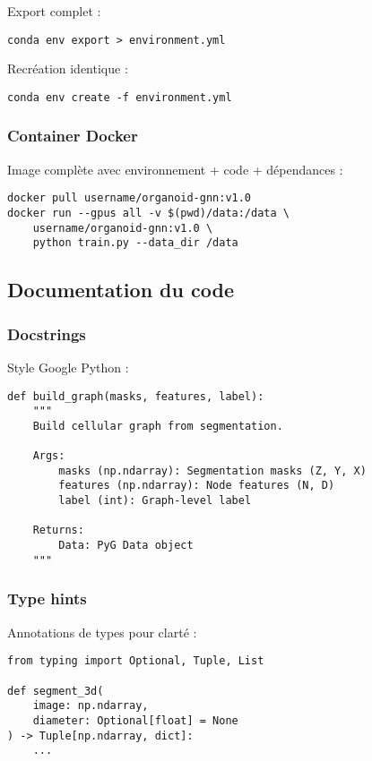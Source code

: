 Export complet :
\begin{verbatim}
conda env export > environment.yml
\end{verbatim}

Recréation identique :
\begin{verbatim}
conda env create -f environment.yml
\end{verbatim}

\subsubsection{Container Docker}

Image complète avec environnement + code + dépendances :
\begin{verbatim}
docker pull username/organoid-gnn:v1.0
docker run --gpus all -v $(pwd)/data:/data \
    username/organoid-gnn:v1.0 \
    python train.py --data_dir /data
\end{verbatim}

\subsection{Documentation du code}

\subsubsection{Docstrings}

Style Google Python :
\begin{verbatim}
def build_graph(masks, features, label):
    """
    Build cellular graph from segmentation.
    
    Args:
        masks (np.ndarray): Segmentation masks (Z, Y, X)
        features (np.ndarray): Node features (N, D)
        label (int): Graph-level label
    
    Returns:
        Data: PyG Data object
    """
\end{verbatim}

\subsubsection{Type hints}

Annotations de types pour clarté :
\begin{verbatim}
from typing import Optional, Tuple, List

def segment_3d(
    image: np.ndarray,
    diameter: Optional[float] = None
) -> Tuple[np.ndarray, dict]:
    ...
\end{verbatim}

